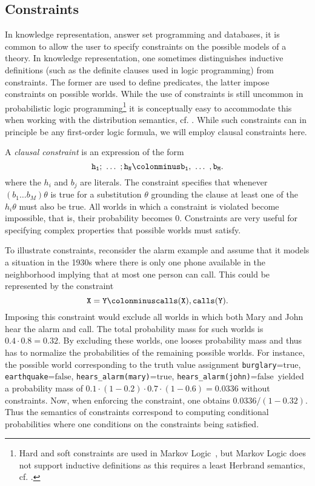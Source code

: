 \documentclass[a4paper]{article}
\newcommand{\true}{\ensuremath{\mathrm{true}}}
\newcommand{\false}{\ensuremath{\mathrm{false}}}
\begin{document}
\subsection{Constraints}
In knowledge representation, answer set programming and databases, it is common to allow the user to 
specify constraints on the possible models of a theory.  
In knowledge representation, one sometimes distinguishes inductive definitions (such as the 
definite clauses used in logic programming) from constraints.
The former are used to define predicates, the latter impose constraints on possible worlds. 
While the use of constraints is still uncommon in probabilistic logic programming\footnote{Hard   
and soft constraints are used in Markov Logic~\citep{Richardson:06},
but Markov Logic does not support inductive definitions as this requires a least Herbrand semantics, cf. \cite{FierensNIPS12}.
}
it is conceptually easy to accommodate this when working with the distribution semantics, cf. \cite{FierensNIPS12}.
While such constraints can in principle be any first-order logic formula, we will employ clausal constraints here.

A \emph{clausal constraint} is an expression of the form 
\begin{equation*}
\mathtt{h_1 ;\ \ldots\ ; h_N \colonminus b_1,\ \ldots\ ,b_M.}
\end{equation*}
where the $h_i$ and $b_j$ are literals. The constraint specifies that whenever $(b_1 \ldots b_M) \theta$ is true
for a substitution $\theta$ grounding the clause at least one of the $h_i\theta$ must also be true. 
All worlds in which a constraint is violated become impossible, that is, their probability becomes 0.
Constraints are very useful for specifying complex properties that 
possible worlds must satisfy. 

To illustrate constraints, reconsider the alarm example and assume that it models a situation in the 1930s where there 
is only one phone available in the neighborhood implying that at most one person can call. This could be represented by the constraint
\begin{equation*}
\mathtt{X=Y \colonminus calls(X), calls(Y).}
\end{equation*}
Imposing this constraint would exclude all worlds in which both Mary and John hear the alarm and call. 
The total probability mass for such worlds is $0.4 \cdot 0.8 = 0.32$. By excluding these worlds, one looses 
probability mass and thus has to normalize the probabilities of the remaining possible worlds. 
For instance, the possible world corresponding to the truth
value assignment \verb|burglary|=\true, \verb|earthquake|=\false,
\verb|hears_alarm(mary)|=\true, \verb|hears_alarm(john)|=\false\  
yielded a probability mass of 
$0.1\cdot (1-0.2)\cdot 0.7 \cdot (1-0.6) = 0.0336$ without constraints. 
Now, when enforcing the constraint, one obtains $0.0336/(1-0.32)$.
Thus the semantics of constraints correspond to computing conditional probabilities where one conditions
on the constraints being satisfied. 
\end{document}
